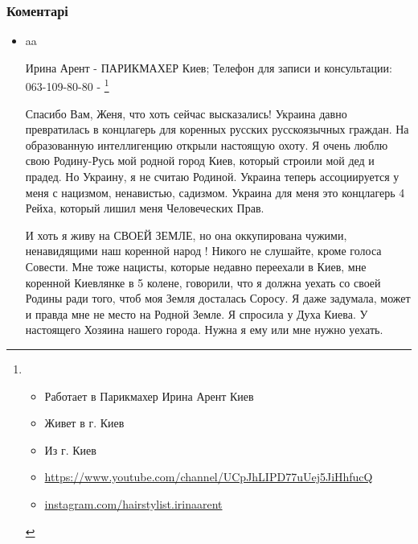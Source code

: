  
 
 
 
 
\subsubsection{Коментарі}

\begin{itemize}

\item aa

Ирина Арент - ПАРИКМАХЕР Киев; Телефон для записи и консультации: 063-109-80-80 - 
\footnote{
\begin{itemize}
  \item Работает в Парикмахер Ирина Арент Киев
  \item Живет в г. Киев
  \item Из г. Киев
  \item \url{https://www.youtube.com/channel/UCpJhLIPD77uUej5JiHhfucQ}
  \item \url{instagram.com/hairstylist.irinaarent}
\end{itemize}
}
\par

Спасибо Вам, Женя, что хоть сейчас высказались! Украина давно превратилась в
концлагерь для коренных русских русскоязычных граждан. На образованную
интеллигенцию открыли настоящую охоту. Я очень люблю свою Родину-Русь мой
родной город Киев, который строили мой дед и прадед. Но Украину, я не считаю
Родиной. Украина теперь ассоциируется у меня с нацизмом, ненавистью, садизмом.
Украина для меня это концлагерь 4 Рейха, который лишил меня Человеческих Прав. 

И хоть я живу на СВОЕЙ ЗЕМЛЕ, но она оккупирована чужими, ненавидящими наш
коренной народ ! Никого не слушайте, кроме голоса Совести. Мне тоже нацисты,
которые недавно переехали в Киев, мне коренной Киевлянке в 5 колене, говорили,
что я должна уехать со своей Родины ради того, чтоб моя Земля досталась Соросу.
Я даже задумала, может и правда мне не место на Родной Земле. Я спросила у Духа
Киева. У настоящего Хозяина нашего города. Нужна я ему или мне нужно уехать.


\end{itemize}
